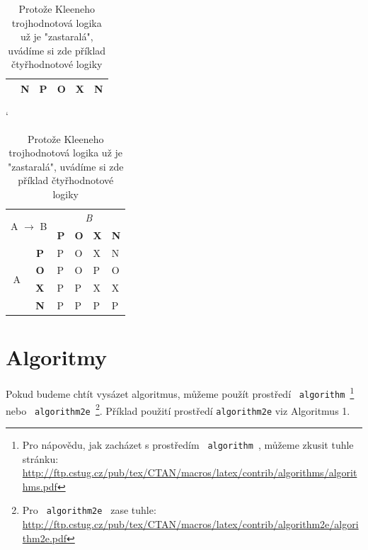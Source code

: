 \documentclass[a4paper,11pt]{article}
\begin{document}
\begin{center}
\begin{table}[htbp]
\begin{tabular}{|c|c|l|l|l|l|}
                            & \textbf{N}         & P          & O          & X          & N          \\ \hline
\end{tabular}
\catcode`
\begin{tabular}{|c|c|l|l|l|l|}
\hline
\multicolumn{2}{|l}{\multirow{2}{*}{A $\rightarrow$ B}} & \multicolumn{4}{|c|}{\emph{B}}                  \\ \cline{3-6} 
\multicolumn{2}{|l|}{}                                  & \textbf{P} & \textbf{O} & \textbf{X} & \textbf{N} \\ \hline
\multirow{4}{*}{A}             & \textbf{P}             & P          & O          & X          & N          \\ \cline{2-6} 
                               & \textbf{O}             & P          & O          & P          & O          \\ \cline{2-6} 
                               & \textbf{X}             & P          & P          & X          & X          \\ \cline{2-6} 
                               & \textbf{N}             & P          & P          & P          & P          \\ \hline
\end{tabular}
\caption{Protože Kleeneho trojhodnotová logika už je "zastaralá", uvádíme si zde příklad čtyřhodnotové logiky}
\label{tab2}
\end{table}
\end{center}

\pagebreak

\section{Algoritmy}
\label{Algoritmy}
\noindent Pokud budeme chtít vysázet algoritmus, můžeme použít prostředí \verb| algorithm |\footnote{Pro nápovědu, jak zacházet s prostředím \texttt{ algorithm }, můžeme zkusit tuhle stránku:\\ 
\href{http://ftp.cstug.cz/pub/tex/CTAN/macros/latex/contrib/algorithms/algorithms.pdf}{http://ftp.cstug.cz/pub/tex/CTAN/macros/latex/contrib/algorithms/algorithms.pdf}}
 nebo \verb| algorithm2e |\footnote{Pro \texttt{ algorithm2e } zase tuhle:
\href{http://ftp.cstug.cz/pub/tex/CTAN/macros/latex/contrib/algorithm2e/algorithm2e.pdf}{http://ftp.cstug.cz/pub/tex/CTAN/macros/latex/contrib/algorithm2e/algorithm2e.pdf}}.
Příklad použití prostředí \verb|algorithm2e| viz Algoritmus 1.
\medskip
\end{document}
